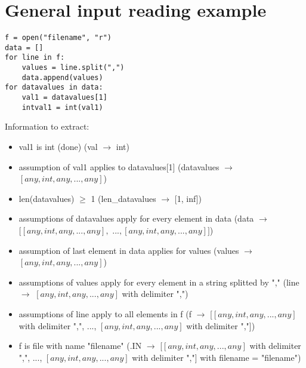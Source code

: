 \documentclass[11pt]{article}
\begin{document}
\section{General input reading example}

\begin{lstlisting}
f = open("filename", "r")
data = []
for line in f:
    values = line.split(",")
    data.append(values)
for datavalues in data:
    val1 = datavalues[1]
    intval1 = int(val1)
\end{lstlisting}

Information to extract:\\

\begin{itemize}
  \item val1 is int (done) (val $\rightarrow$ int)
  \item assumption of val1 applies to datavalues[1] (datavalues $\rightarrow$ $[any, int, any, ..., any]$)
  \item len(datavalues) $\ge$ 1 (len\_datavalues $\rightarrow$ [1, inf])
  \item assumptions of datavalues apply for every element in data (data $\rightarrow$ $[[any, int, any, ..., any], $ $..., [any, int, any, ..., any]]$)
  \item assumption of last element in data applies for values (values $\rightarrow$ $[any, int, any, ..., any]$)
  \item assumptions of values apply for every element in a string splitted by "," (line $\rightarrow$ $[any, int, any, ..., any]$ with delimiter ",")
  \item assumptions of line apply to all elements in f (f $\rightarrow$ [$[any, int, any, ..., any]$ with delimiter ",", ..., $[any, int, any, ..., any]$ with delimiter ","])
  \item f is file with name "filename" (.IN $\rightarrow$ [$[any, int, any, ..., any]$ with delimiter ",", ..., $[any, int, any, ..., any]$ with delimiter ","] with filename = "filename")
\end{itemize}
\end{document}
